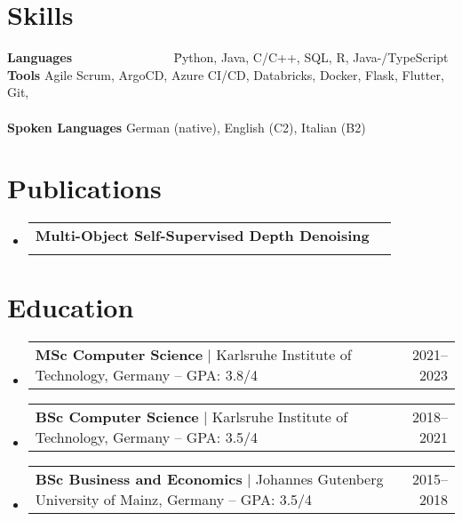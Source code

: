 \documentclass[letterpaper,11pt]{article}
\makeatletter
\newcommand{\resumeProjectHeading}[2]{
    \item
    \begin{tabular*}{0.97\textwidth}{l@{\extracolsep{\fill}}r}
      \small#1 & #2 \\
    \end{tabular*}\vspace{-7pt}
}
\newcommand{\resumeSubHeadingListStart}{\begin{itemize}[leftmargin=0.15in, label={}]}
\newcommand{\resumeSubHeadingListEnd}{\end{itemize}}
\makeatother
\begin{document}
\section{Skills}
\begin{itemize}[leftmargin=0.15in, label={}]
	\small{\item{
	      \begin{tabbing}
		      \textbf{Languages} ~~~~~~~~~~~~~~~ \={Python, Java, C/C++, SQL, R, Java-/TypeScript} \\
		      \textbf{Tools} \> {Agile Scrum, ArgoCD, Azure CI/CD, Databricks, Docker, Flask, Flutter, Git,} \\
		       \\
		      \textbf{Spoken Languages} \> {German (native), English (C2), Italian (B2)}
	      \end{tabbing}
	      }}
\end{itemize}

\section{Publications}
\resumeSubHeadingListStart
\resumeProjectHeading{\textbf{Multi-Object Self-Supervised Depth Denoising} \space [Kienle \& Petri, 2023, \href{https://arxiv.org/abs/2305.05778}{{arXiv: 2305.05778}}]}\\
\resumeSubHeadingListEnd

\section{Education}
\resumeSubHeadingListStart
\resumeProjectHeading
{\textbf{MSc Computer Science} \space $|$ \space Karlsruhe Institute of Technology, Germany -- GPA: 3.8/4}{2021--2023}
\resumeProjectHeading
{\textbf{BSc Computer Science} \space $|$ \space Karlsruhe Institute of Technology, Germany -- GPA: 3.5/4}{2018--2021}
\resumeProjectHeading
{\textbf{BSc Business and Economics} \space $|$ \space Johannes Gutenberg University of Mainz, Germany -- GPA: 3.5/4}{2015--2018}
\resumeSubHeadingListEnd

\end{document}
